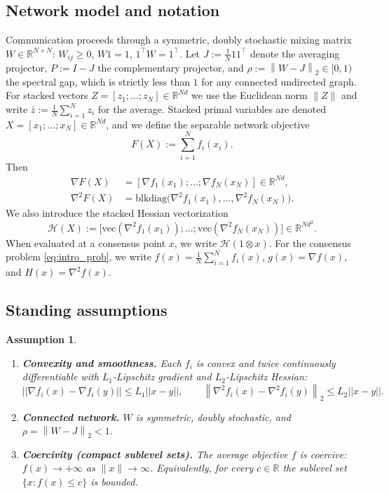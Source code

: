 \documentclass[11pt,a4paper]{article}
\def\one{1}%
\def\J{J}%
\def\Pmat{P}%
\def\norm#1{||#1||}%
\newtheorem{assumption}[theorem]{Assumption}
\newcommand{\R}{\mathbb{R}}
\newcommand{\one}{\mathbf{1}}
\newcommand{\norm}[1]{\left\|#1\right\|}
\newcommand{\normtwo}[1]{\left\|#1\right\|_2}
\newcommand{\J}{\left(\frac{1}{N}\one\one^\top\right)}
\newcommand{\Pmat}{I-\J}
\begin{document}
	\subsection{Network model and notation}
	Communication proceeds through a symmetric, doubly stochastic
	mixing matrix $W\in\R^{N\times N}$:
	$W_{ij}\ge0$, $W\one=\one$, $\one^\top W=\one^\top$.
	Let $\J:=\frac{1}{N}\one\one^\top$ denote the averaging projector,
	$\Pmat:=I-\J$ the complementary projector, and
	$\rho := \normtwo{W-\J}\in[0,1)$ the spectral gap, which is
	strictly less than $1$ for any connected undirected graph.
	For stacked vectors $Z=[z_1;\dots;z_N]\in\R^{Nd}$ we use the
	Euclidean norm $\|Z\|$ and write $\bar z:=\frac1N\sum_{i=1}^N z_i$
	for the average.
	Stacked primal variables are denoted
	$X=[x_1;\dots;x_N]\in\R^{Nd}$, and we define the separable
	network objective
	\[
	F(X):=\sum_{i=1}^N f_i(x_i).
	\]
	Then
	\begin{align*}
	\nabla F(X)&=[\nabla f_1(x_1);\dots;\nabla f_N(x_N)]\in\R^{Nd},\\
	\nabla^2 F(X)&=\mathrm{blkdiag}\bigl(\nabla^2 f_1(x_1),\dots,\nabla^2 f_N(x_N)\bigr).
	\end{align*}
	We also introduce the stacked Hessian vectorization
	\[
	\mathcal H(X):=\bigl[\mathrm{vec}(\nabla^2 f_1(x_1));\dots;\mathrm{vec}(\nabla^2 f_N(x_N))\bigr]\in\R^{Nd^2}.
	\]
	When evaluated at a consensus point $x$, we write $\mathcal H(\one\otimes x)$.
	For the consensus problem \eqref{eq:intro_prob}, we write
	$f(x)=\frac1N\sum_{i=1}^N f_i(x)$, $g(x)=\nabla f(x)$, and $H(x)=\nabla^2 f(x)$.
	
	\subsection{Standing assumptions}
	\begin{assumption}\label{ass:standing}
		\begin{enumerate}[nosep,leftmargin=1em]
			\item \textbf{Convexity and smoothness.}
			Each $f_i$ is convex and twice continuously differentiable
			with $L_1$-Lipschitz gradient and $L_2$-Lipschitz Hessian:
			\[
			\norm{\nabla f_i(x)-\nabla f_i(y)}\le L_1\norm{x-y},
			\qquad
			\normtwo{\nabla^2 f_i(x)-\nabla^2 f_i(y)}\le L_2\norm{x-y}.
			\]
			\item \textbf{Connected network.} $W$ is symmetric, doubly stochastic, and $\rho=\normtwo{W-\J}<1$.
			\item \textbf{Coercivity (compact sublevel sets).}
			The average objective $f$ is coercive: $f(x)\to+\infty$ as $\|x\|\to\infty$.
			Equivalently, for every $c\in\R$ the sublevel set $\{x:f(x)\le c\}$ is bounded.
		\end{enumerate}
	\end{assumption}
\end{document}
